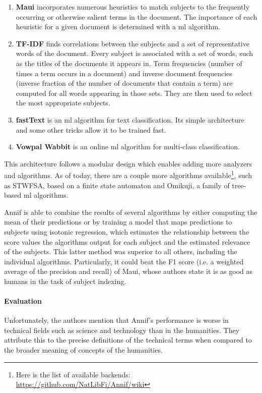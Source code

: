 \begin{enumerate}
    \item \textbf{Maui} incorporates numerous heuristics to match subjects to the frequently occurring or otherwise salient terms in the document. The importance of each heuristic for a given document is determined with a \acrshort{ml} algorithm.
    \item \textbf{TF-IDF} finds correlations between the subjects and a set of representative words of the document. Every subject is associated with a set of words, such as the titles of the documents it appears in. Term frequencies (number of times a term occurs in a document) and inverse document frequencies (inverse fraction of the number of documents that contain a term) are computed for all words appearing in those sets. They are then used to select the most appropriate subjects.
    \item \textbf{fastText} is an \acrshort{ml} algorithm for text classification. Its simple architecture and some other tricks allow it to be trained fast.
    \item \textbf{Vowpal Wabbit} is an online \acrshort{ml} algorithm for multi-class classification.
\end{enumerate}

This architecture follows a modular design which enables adding more analyzers and algorithms. As of today, there are a couple more algorithms available\footnote{Here is the list of available backends:  \url{https://github.com/NatLibFi/Annif/wiki}}, such as STWFSA, based on a finite state automaton and Omikuji, a family of tree-based \acrshort{ml} algorithms.

Annif is able to combine the results of several algorithms by either computing the mean of their predictions or by training a model that maps predictions to subjects using isotonic regression, which estimates the relationship between the score values the algorithms output for each subject and the estimated relevance of the subjects. This latter method was superior to all others, including the individual algorithms. Particularly, it could beat the F1 score (i.e. a weighted average of the precision and recall) of Maui, whose authors state it is as good as humans in the task of subject indexing.

\paragraph{Evaluation} \mbox{}

Unfortunately, the authors mention that Annif's performance is worse in technical fields such as science and technology than in the humanities. They attribute this to the precise definitions of the technical terms when compared to the broader meaning of concepts of the humanities.

